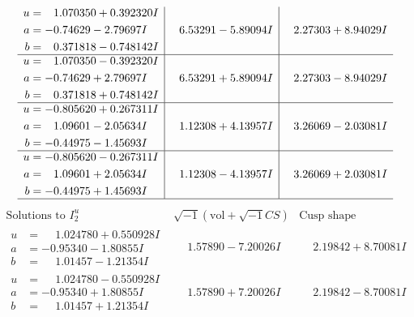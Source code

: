 \documentclass[1p]{elsarticle_modified}
\theoremstyle{definition}
\newcommand{\I}{\sqrt{-1}}
\begin{document}
$$\begin{array}{c|c|c}
\begin{aligned}
u &= \phantom{-}1.070350 + 0.392320 I \\
a &= -0.74629 - 2.79697 I \\
b &= \phantom{-}0.371818 - 0.748142 I\end{aligned}
 & \phantom{-}6.53291 - 5.89094 I & \phantom{-}2.27303 + 8.94029 I \\ \hline\begin{aligned}
u &= \phantom{-}1.070350 - 0.392320 I \\
a &= -0.74629 + 2.79697 I \\
b &= \phantom{-}0.371818 + 0.748142 I\end{aligned}
 & \phantom{-}6.53291 + 5.89094 I & \phantom{-}2.27303 - 8.94029 I \\ \hline\begin{aligned}
u &= -0.805620 + 0.267311 I \\
a &= \phantom{-}1.09601 - 2.05634 I \\
b &= -0.44975 - 1.45693 I\end{aligned}
 & \phantom{-}1.12308 + 4.13957 I & \phantom{-}3.26069 - 2.03081 I \\ \hline\begin{aligned}
u &= -0.805620 - 0.267311 I \\
a &= \phantom{-}1.09601 + 2.05634 I \\
b &= -0.44975 + 1.45693 I\end{aligned}
 & \phantom{-}1.12308 - 4.13957 I & \phantom{-}3.26069 + 2.03081 I\\
 \hline 
 \end{array}$$\newpage$$\begin{array}{c|c|c}  
\text{Solutions to }I^u_{2}& \I (\text{vol} + \sqrt{-1}CS) & \text{Cusp shape}\\
 \hline 
\begin{aligned}
u &= \phantom{-}1.024780 + 0.550928 I \\
a &= -0.95340 - 1.80855 I \\
b &= \phantom{-}1.01457 - 1.21354 I\end{aligned}
 & \phantom{-}1.57890 - 7.20026 I & \phantom{-}2.19842 + 8.70081 I \\ \hline\begin{aligned}
u &= \phantom{-}1.024780 - 0.550928 I \\
a &= -0.95340 + 1.80855 I \\
b &= \phantom{-}1.01457 + 1.21354 I\end{aligned}
 & \phantom{-}1.57890 + 7.20026 I & \phantom{-}2.19842 - 8.70081 I \\ \hline\begin{aligned}

\end{aligned}
\end{array}$$
\end{document}
